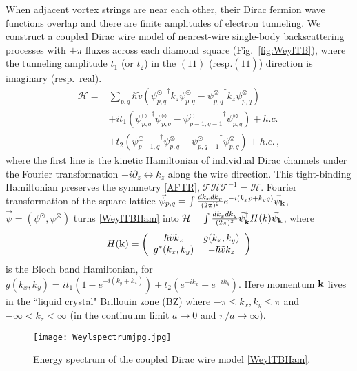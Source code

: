 When adjacent vortex strings are near each other, their Dirac fermion wave functions overlap and there are finite amplitudes of electron tunneling. We construct a coupled Dirac wire model of nearest-wire single-body backscattering processes with $\pm\pi$ fluxes across each diamond square (Fig.~\ref{fig:WeylTB}), where the tunneling amplitude $t_1$ (or $t_2$) in the $(11)$ (resp.$(\bar{1}1)$) direction is imaginary (resp.~real). \begin{align}\mathcal{H}=&\sum_{p,q}\hbar\tilde{v}\left({\psi_{p,q}^\odot}^\dagger k_z\psi_{p,q}^\odot-{\psi_{p,q}^\otimes}^\dagger k_z\psi_{p,q}^\otimes\right)\nonumber\\&+it_1\left({\psi_{p,q}^\odot}^\dagger\psi_{p,q}^\otimes-{\psi_{p-1,q-1}^\odot}^\dagger\psi_{p,q}^\otimes\right)+h.c.\label{WeylTBHam}\\&+t_2\left({\psi_{p-1,q}^\odot}^\dagger\psi_{p,q}^\otimes-{\psi_{p,q-1}^\odot}^\dagger\psi_{p,q}^\otimes\right)+h.c.\nonumber \,, \end{align} where the first line is the kinetic Hamiltonian of individual Dirac channels under the Fourier transformation $-i\partial_z\leftrightarrow k_z$ along the wire direction. This tight-binding Hamiltonian preserves the \AFTR symmetry \eqref{AFTR}, $\mathcal{T}\mathcal{H}\mathcal{T}^{-1}=\mathcal{H}$. Fourier transformation of the square lattice $\vec\psi_{p,q}=\int\frac{dk_xdk_y}{(2\pi)^2}e^{-i(k_xp+k_yq)}\vec\psi_{\bf k}$, $\vec\psi=(\psi^\odot,\psi^\otimes)$ turns \eqref{WeylTBHam} into $\mathcal{H}=\int\frac{dk_xdk_y}{(2\pi)^2}\vec\psi_{\bf k}^\dagger H(k)\vec\psi_{\bf k}$, where \begin{align}H({\bf k})=\left(\begin{array}{*{20}c}\hbar\tilde{v}k_z&g(k_x,k_y)\\g^\ast(k_x,k_y)&-\hbar\tilde{v}k_z\end{array}\right)\label{BlochHam}\end{align} is the Bloch band Hamiltonian, for $g(k_x,k_y)=it_1(1-e^{-i(k_y+k_x)})+t_2(e^{-ik_x}-e^{-ik_y})$. Here momentum ${\bf k}$ lives in the ``liquid crystal" Brillouin zone (\hypertarget{BZ}{BZ}) where $-\pi\leq k_x,k_y\leq\pi$ and $-\infty<k_z<\infty$ (in the continuum limit $a\to0$ and $\pi/a\to\infty$). 

\begin{figure}[htbp]
	\centering\texttt{[image: Weylspectrumjpg.jpg]}
	\caption{Energy spectrum of the coupled Dirac wire model \eqref{WeylTBHam}.}\label{fig:Weylspectrum}
\end{figure}

